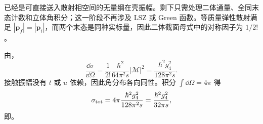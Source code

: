 \begin{exbox}
\medskip

 已经是可直接送入散射相空间的无量纲在壳振幅。剩下只需处理二体通量、全同末态计数和立体角积分；这一阶段不再涉及 LSZ 或 Green 函数。等质量弹性散射满足 $|\mathbf p_f|=|\mathbf p_i|$，而两个末态是同种实标量，因此二体截面母式中的对称因子为 $1/2!$。

由，
\[
 \frac{\dd\sigma}{\dd\Omega}
 =\frac1{2!}\frac{\hbar^2}{64\pi^2s}
 |\mathcal M|^2
 =\frac{\hbar^2g_4^2}{128\pi^2s}.
\]
接触振幅没有 $t$ 或 $u$ 依赖，因此角分布各向同性。积分 $\int\dd\Omega=4\pi$ 得
\[
 \sigma_{\rm tot}
 =4\pi\frac{\hbar^2g_4^2}{128\pi^2s}
 =\frac{\hbar^2g_4^2}{32\pi s},
\]
即。
\end{exbox}




